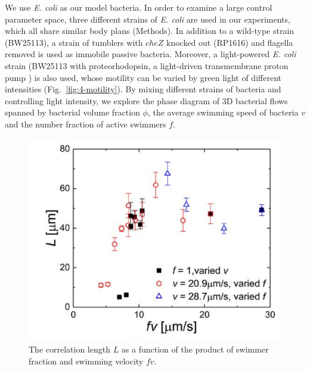 We use  \textit{E. coli} as our model bacteria. In order to examine a large control parameter space, three different strains of \textit{E. coli} are used in our experiments, which all share similar body plans (Methods). In addition to a wild-type strain (BW25113), a strain of tumblers with $cheZ$ knocked out (RP1616) and flagella removed is used as immobile passive bacteria. Moreover, a light-powered
\textit{E. coli} strain (BW25113 with proteorhodopsin, a light-driven transmembrane proton pump \cite{Walter2007}) is also used, whose motility can be varied by green light of different intensities (Fig.~\ref{fig:4-motility}). By mixing different strains of bacteria and controlling light intensity, we explore the phase diagram of 3D bacterial flows spanned by bacterial volume fraction $\phi$, the average swimming speed of bacteria $v$ and the number fraction of active swimmers $f$.

\begin{figure}[!ht]
	\begin{center}
	\includegraphics[width=4 in]{Figs/4-Emergence/S2C.pdf}
	\end{center}
	\caption[The correlation length as a function of the product of swimmer fraction and swimming velocity]
	{
	The correlation length $L$ as a function of the product of swimmer fraction and swimming velocity $fv$.
  }
	\label{fig:4-correlation-length}
\end{figure}


